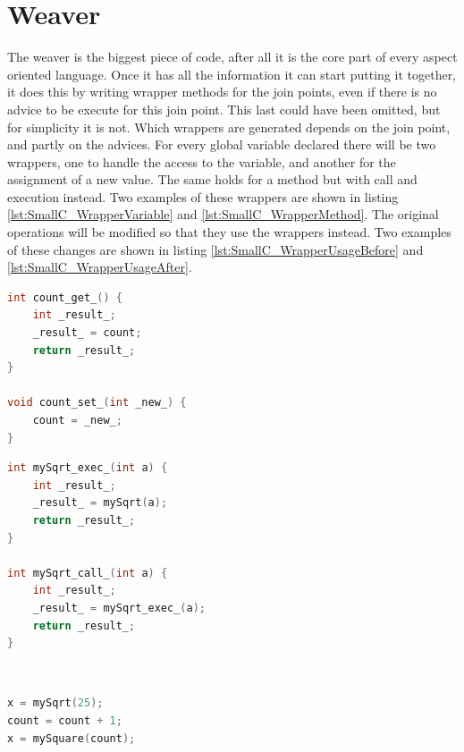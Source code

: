 \documentclass[a4paper]{report}
\begin{document}
\section{Weaver}
The weaver is the biggest piece of code, after all it is the core part of every aspect oriented language. Once it has all the information it can start putting it together, it does this by writing wrapper methods for the join points, even if there is no advice to be execute for this join point. This last could have been omitted, but for simplicity it is not. Which wrappers are generated depends on the join point, and partly on the advices. For every global variable declared there will be two wrappers, one to handle the access to the variable, and another for the assignment of a new value. The same holds for a method but with call and execution instead. Two examples of these wrappers are shown in listing \ref{lst:SmallC_WrapperVariable} and \ref{lst:SmallC_WrapperMethod}. The original operations will be modified so that they use the wrappers instead. Two examples of these changes are shown in listing \ref{lst:SmallC_WrapperUsageBefore} and \ref{lst:SmallC_WrapperUsageAfter}.\\
\begin{minipage}{0.45\textwidth}
\begin{lstlisting}[language=C, caption=Example of variable wrappers, label=lst:SmallC_WrapperVariable]
int count_get_() {
	int _result_;
	_result_ = count;
	return _result_;
}

void count_set_(int _new_) {
	count = _new_;
}
\end{lstlisting}
\end{minipage}\hfill
\begin{minipage}{0.45\textwidth}
\begin{lstlisting}[language=C, caption=Example of method wrappers, label=lst:SmallC_WrapperMethod]
int mySqrt_exec_(int a) {
	int _result_;
	_result_ = mySqrt(a);
	return _result_;
}

int mySqrt_call_(int a) {
	int _result_;
	_result_ = mySqrt_exec_(a);
	return _result_;
}
\end{lstlisting}
\end{minipage}\\
\begin{minipage}{0.45\textwidth}
\begin{lstlisting}[language=C, caption=Example of code before weaving, label=lst:SmallC_WrapperUsageBefore]
x = mySqrt(25);
count = count + 1;
x = mySquare(count);
\end{lstlisting}
\end{minipage}\hfill
\end{document}
